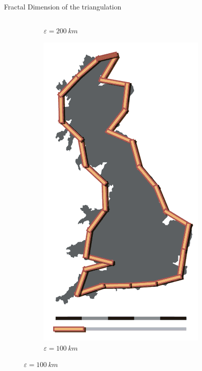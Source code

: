 \begin{frame}{Fractal Dimension of the triangulation}
\begin{columns}
\begin{column}{0.38\textwidth}
\begin{figure}
\begin{subfigure}{0.32\textwidth}
     \caption{$\varepsilon=\SI{200}{km}$}
    \end{subfigure}
    \begin{subfigure}{0.32\textwidth}
     \includegraphics[width=\textwidth]{pics/Britain-fractal-coastline-100km}
     \caption{$\varepsilon=\SI{100}{km}$}
    \end{subfigure}

\end{figure}
\end{column}
\end{columns}
\end{frame}
